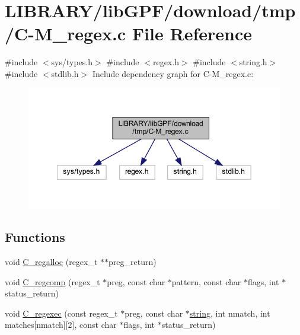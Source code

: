 \hypertarget{C-M__regex_8c}{}\section{L\+I\+B\+R\+A\+R\+Y/lib\+G\+P\+F/download/tmp/\+C-\/\+M\+\_\+regex.c File Reference}
\label{C-M__regex_8c}
{\ttfamily \#include $<$sys/types.\+h$>$}\newline
{\ttfamily \#include $<$regex.\+h$>$}\newline
{\ttfamily \#include $<$string.\+h$>$}\newline
{\ttfamily \#include $<$stdlib.\+h$>$}\newline
Include dependency graph for C-\/\+M\+\_\+regex.c\+:
\nopagebreak
\begin{figure}[H]
\begin{center}
\leavevmode
\includegraphics[width=349pt]{C-M__regex_8c__incl}
\end{center}
\end{figure}
\subsection*{Functions}
\begin{DoxyCompactItemize}
\item 
void \hyperlink{C-M__regex_8c_a749eb5df717b312d898ea0a3b279e7ca}{C\+\_\+regalloc} (regex\+\_\+t $\ast$$\ast$preg\+\_\+return)
\item 
void \hyperlink{C-M__regex_8c_a3fcdbec663d5285a401e73c4cdca37be}{C\+\_\+regcomp} (regex\+\_\+t $\ast$preg, const char $\ast$pattern, const char $\ast$flags, int $\ast$status\+\_\+return)
\item 
void \hyperlink{C-M__regex_8c_ad4d383ae55d866605fb7ff11e8cf99d8}{C\+\_\+regexec} (const regex\+\_\+t $\ast$preg, const char $\ast$\hyperlink{what__overview_81_8txt_a74cb7e955273b9f9157b4f0c18a38849}{string}, int nmatch, int matches\mbox{[}nmatch\mbox{]}\mbox{[}2\mbox{]}, const char $\ast$flags, int $\ast$status\+\_\+return)
\end{DoxyCompactItemize}


